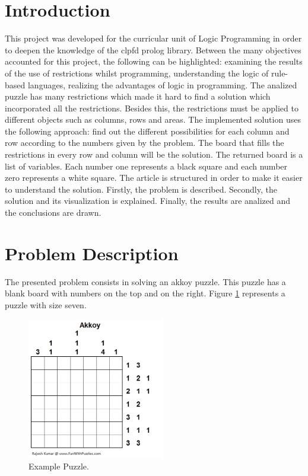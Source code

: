 \documentclass[runningheads,a4paper]{llncs}
\begin{document}
\section{Introduction}

This project was developed for the curricular unit of Logic Programming in order to deepen the knowledge of the clpfd prolog library. Between the many objectives accounted for this project, the following can be highlighted: examining the results of the use of restrictions whilst programming, understanding the logic of rule-based languages, realizing the advantages of logic in programming. The analized puzzle has many restrictions which made it hard to find a solution which incorporated all the restrictions. Besides this, the restrictions must be applied to different objects such as columns, rows and areas. The implemented solution uses the following approach: find out the different possibilities for each column and row according to the numbers given by the problem. The board that fills the restrictions in every row and column will be the solution. The returned board is a list of variables. Each number one represents a black square and each number zero represents a white square. 
The article is structured in order to make it easier to understand the solution. Firstly, the problem is described. Secondly, the solution and its visualization is explained. Finally, the results are analized and the conclusions are drawn. 

\section {Problem Description}

The presented problem consists in solving an akkoy puzzle. This puzzle has a blank board with numbers on the top and on the right. Figure \ref{example} represents a puzzle with size seven. 

\begin{figure}
\centering
\includegraphics[height=6.2cm]{puzzleExemplo.png}
\caption{Example Puzzle.}
\label{example}
\end{figure}
\end{document}
